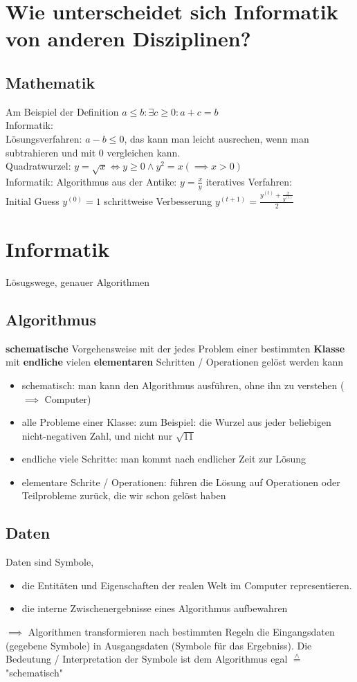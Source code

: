 \documentclass[a4paper]{scrartcl}
\newcommand{\estimates}{\overset{\scriptscriptstyle\wedge}{=}}%
\theoremstyle{definition}
\theoremstyle{plain}
\theoremstyle{remark}
\theoremstyle{remark}
\begin{document}
\section{Wie unterscheidet sich Informatik von anderen Disziplinen?}
\label{sec-2}
\subsection{Mathematik}
\label{sec-2-1}
Am Beispiel der Definition $a \leq b: \exists c \geq 0: a + c = b$ \\
   Informatik: \\
   Lösungsverfahren: $a - b \leq 0$, das kann man leicht ausrechen, wenn man subtrahieren und mit $0$ vergleichen kann. \\
   Quadratwurzel: $y = \sqrt{x} \iff y \geq 0 \wedge y^2 = x (\implies x > 0)$ \\
   Informatik: Algorithmus aus der Antike: $y = \frac{x}{y}$
iteratives Verfahren: \\
   Initial Guess $y^{(0)} = 1$
schrittweise Verbesserung $y^{(t+1)} = \frac{y^{(t)} + \frac{x}{y^{(t)}}}{2}$
\section{Informatik}
\label{sec-3}
Lösugswege, genauer Algorithmen
\subsection{Algorithmus}
\label{sec-3-1}
\textbf{schematische} Vorgehensweise mit der jedes Problem einer bestimmten \textbf{Klasse} mit \textbf{endliche} vielen \textbf{elementaren} Schritten / Operationen gelöst werden kann
\begin{itemize}
\item schematisch: man kann den Algorithmus ausführen, ohne ihn zu verstehen ($\implies$ Computer)
\item alle Probleme einer Klasse: zum Beispiel: die Wurzel aus jeder beliebigen nicht-negativen Zahl, und nicht nur $\sqrt{11}$
\item endliche viele Schritte: man kommt nach endlicher Zeit zur Lösung
\item elementare Schrite / Operationen: führen die Lösung auf Operationen oder Teilprobleme zurück, die wir schon gelöst haben
\end{itemize}
\subsection{Daten}
\label{sec-3-2}
Daten sind Symbole,
\begin{itemize}
\item die Entitäten und Eigenschaften der realen Welt im Computer representieren.
\item die interne Zwischenergebnisse eines Algorithmus aufbewahren
\end{itemize}
$\implies$ Algorithmen transformieren nach bestimmten Regeln die Eingangsdaten (gegebene Symbole) in Ausgangsdaten (Symbole für das Ergebniss).
Die Bedeutung / Interpretation der Symbole ist dem Algorithmus egal $\estimates$ "schematisch"
\end{document}
